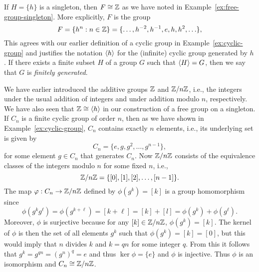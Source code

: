 \begin{example}
    If \(H = \{h\}\) is a singleton, then \(F \cong \mathbb{Z}\) as we have noted in
    Example~\ref{ex:free-group-singleton}. More explicitly, \(F\) is the group
    \[
        F = \{h^n : n \in \mathbb{Z}\} = \{\ldots, h^{-2}, h^{-1}, e, h, h^2, \ldots\},
    \]
    This agrees with our earlier definition of a cyclic group in
    Example~\ref{ex:cyclic-group} and justifies the notation \(\langle h \rangle\) for the
    (infinite) cyclic group generated by \(h\). If there exists a finite subset
    \(H\) of a group \(G\) such that \(\langle H \rangle = G\), then we say that \(G\) is
    \emph{finitely generated}.
\end{example}

\begin{example}
    \label{ex:subgroup-cyclic-group}
    We have earlier introduced the additive groups \(\mathbb{Z}\) and \(\mathbb{Z}/n\mathbb{Z}\), i.e.,
    the integers under the usual addition of integers and under addition modulo
    \(n\), respectively. We have also seen that \(\mathbb{Z} \cong \langle h \rangle\) in our
    construction of a free group on a singleton. If \(C_n\) is a finite cyclic
    group of order \(n\), then as we have shown in
    Example~\ref{ex:cyclic-group}, \(C_n\) contains exactly \(n\) elements,
    i.e., its underlying set is given by
    \[
        C_n = \{e, g, g^2, \ldots, g^{n-1}\},
    \]
    for some element \(g \in C_n\) that generates \(C_n\). Now \(\mathbb{Z}/n\mathbb{Z}\)
    consists of the equivalence classes of the integers modulo \(n\) for some
    fixed \(n\), i.e.,
    \[
        \mathbb{Z}/n\mathbb{Z} = \{[0], [1], [2], \ldots, [n-1]\}.
    \]
    The map \(\varphi: C_n \to \mathbb{Z}/n\mathbb{Z}\) defined by \(\phi(g^k) = [k]\) is a group
    homomorphism since
    \[
        \phi(g^k g^\ell) = \phi(g^{k+\ell}) = [k+\ell] = [k] + [l] = \phi(g^k) + \phi(g^\ell).
    \]
    Moreover, \(\phi\) is surjective because for any \([k] \in \mathbb{Z}/n\mathbb{Z}\),
    \(\phi(g^k) = [k]\). The kernel of \(\phi\) is then the set of all elements
    \(g^k\) such that \(\phi(g^k) = [k] = [0]\), but this would imply that \(n\)
    divides \(k\) and \(k = qn\) for some integer \(q\). From this it follows
    that \(g^k = g^{qn} = (g^n)^q = e\) and thus \(\ker \phi = \{e\}\) and
    \(\phi\) is injective. Thus \(\phi\) is an isomorphism and \(C_n \cong
    \mathbb{Z}/n\mathbb{Z}\).


\end{example}
